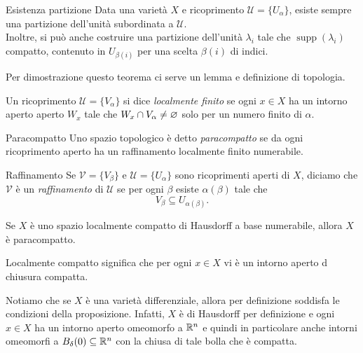 \documentclass[a4paper]{article}
\begin{document}
\begin{snippettheorem}{Esistenza partizione}
    Data una varietà \(X\)
    e ricoprimento \(\mathcal U = \{U_\alpha\}\),
    esiste sempre una partizione dell'unità subordinata a \(\mathcal U\). \\
    Inoltre, si può anche costruire una partizione dell'unità \(\lambda_i\)
    tale che \(\operatorname{supp}(\lambda_i)\) compatto, contenuto in \(U_{\beta(i)}\)
    per una scelta \(\beta(i)\) di indici.
\end{snippettheorem}

Per dimostrazione questo teorema ci serve un lemma e definizione di topologia.

\begin{snippetdefinition}{}
    Un ricoprimento \(\mathcal U = \{V_\alpha\}\)
    si dice \emph{localmente finito} se ogni \(x \in X\)
    ha un intorno aperto aperto \(W_x\) tale che \(W_x \cap V_\alpha \neq \varnothing\)
    solo per un numero finito di \(\alpha\).
\end{snippetdefinition}

\begin{snippetdefinition}{Paracompatto}
    Uno spazio topologico è detto \emph{paracompatto}
    se da ogni ricoprimento aperto ha un raffinamento localmente finito numerabile.
\end{snippetdefinition}

\begin{snippetdefinition}{Raffinamento}
    Se \(\mathcal V = \{V_\beta\}\) e \(\mathcal U = \{U_\alpha\}\)
    sono ricoprimenti aperti di \(X\), diciamo che \(\mathcal V\)
    è un \emph{raffinamento} di \(\mathcal U\) se per ogni \(\beta\)
    esiste \(\alpha(\beta)\) tale che \[
        V_\beta \subseteq U_{\alpha(\beta)}.
    \]
\end{snippetdefinition}

\begin{snippetproposition}{}
    Se \(X\) è uno spazio localmente compatto
    di Hausdorff a base numerabile, allora \(X\) è paracompatto.
\end{snippetproposition}

Localmente compatto significa che per ogni \(x \in X\) vi è un intorno aperto
d chiusura compatta.

Notiamo che se \(X\) è una varietà differenziale, allora
per definizione soddisfa
le condizioni della proposizione. Infatti,
\(X\) è di Hausdorff per definizione e ogni \(x \in X\)
ha un intorno aperto omeomorfo a \(\mathbb{R}^n\)
e quindi in particolare anche intorni omeomorfi a \(B_\delta(0) \subseteq \mathbb{R}^n\)
con la chiusa di tale bolla che è compatta.
\end{document}
